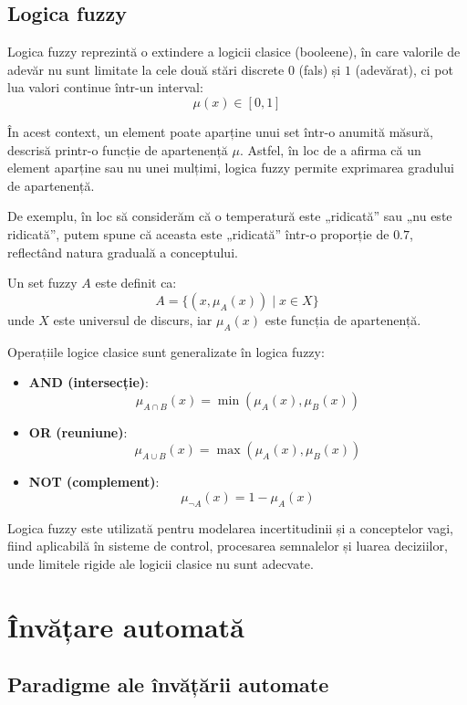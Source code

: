 \subsection*{Logica fuzzy}

Logica fuzzy reprezintă o extindere a logicii clasice (booleene), în care valorile de adevăr nu sunt limitate la cele două stări discrete \(0\) (fals) și \(1\) (adevărat), ci pot lua valori continue într-un interval:
\[
    \mu(x) \in [0, 1]
\]

În acest context, un element poate aparține unui set într-o anumită măsură, descrisă printr-o funcție de apartenență \( \mu \). Astfel, în loc de a afirma că un element aparține sau nu unei mulțimi, logica fuzzy permite exprimarea gradului de apartenență.

De exemplu, în loc să considerăm că o temperatură este „ridicată” sau „nu este ridicată”, putem spune că aceasta este „ridicată” într-o proporție de \(0.7\), reflectând natura graduală a conceptului.

Un set fuzzy \(A\) este definit ca:
\[
    A = \{(x, \mu_A(x)) \mid x \in X\}
\]
unde \(X\) este universul de discurs, iar \(\mu_A(x)\) este funcția de apartenență.

Operațiile logice clasice sunt generalizate în logica fuzzy:
\begin{itemize}
    \item \textbf{AND (intersecție)}:
    \[
        \mu_{A \cap B}(x) = \min(\mu_A(x), \mu_B(x))
    \]
    \item \textbf{OR (reuniune)}:
    \[
        \mu_{A \cup B}(x) = \max(\mu_A(x), \mu_B(x))
    \]
    \item \textbf{NOT (complement)}:
    \[
        \mu_{\neg A}(x) = 1 - \mu_A(x)
    \]
\end{itemize}

Logica fuzzy este utilizată pentru modelarea incertitudinii și a conceptelor vagi, fiind aplicabilă în sisteme de control, procesarea semnalelor și luarea deciziilor, unde limitele rigide ale logicii clasice nu sunt adecvate.

\section{Învățare automată}

\subsection*{Paradigme ale învățării automate}

